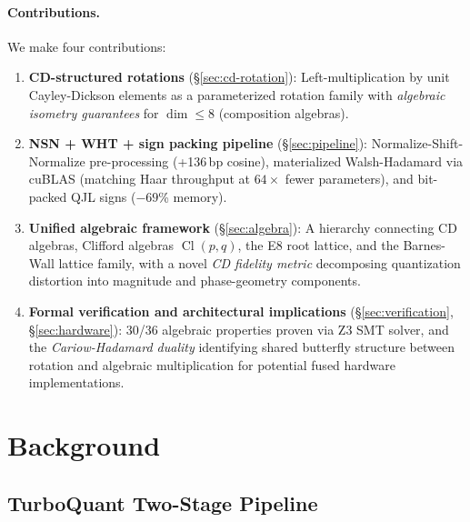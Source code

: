 \documentclass[sigconf,anonymous,review]{acmart}
\DeclareMathOperator{\Cl}{Cl}
\begin{document}
\paragraph{Contributions.}
We make four contributions:
\begin{enumerate}[nosep,leftmargin=*]
  \item \textbf{CD-structured rotations} (\S\ref{sec:cd-rotation}):
        Left-multiplication by unit Cayley-Dickson elements as a
        parameterized rotation family with \emph{algebraic isometry
        guarantees} for $\dim \leq 8$ (composition algebras).

  \item \textbf{NSN + WHT + sign packing pipeline} (\S\ref{sec:pipeline}):
        Normalize-Shift-Normalize pre-processing (+136\,bp cosine),
        materialized Walsh-Hadamard via cuBLAS (matching Haar throughput
        at $64\times$ fewer parameters), and bit-packed QJL signs
        ($-69$\% memory).

  \item \textbf{Unified algebraic framework} (\S\ref{sec:algebra}):
        A hierarchy connecting CD algebras, Clifford algebras $\Cl(p,q)$,
        the E8 root lattice, and the Barnes-Wall lattice family, with
        a novel \emph{CD fidelity metric} decomposing quantization
        distortion into magnitude and phase-geometry components.

  \item \textbf{Formal verification and architectural implications}
        (\S\ref{sec:verification}, \S\ref{sec:hardware}):
        30/36 algebraic properties proven via Z3 SMT solver, and
        the \emph{Cariow-Hadamard duality} identifying shared butterfly
        structure between rotation and algebraic multiplication for
        potential fused hardware implementations.
\end{enumerate}

\section{Background}
\label{sec:background}

\subsection{TurboQuant Two-Stage Pipeline}
\end{document}
